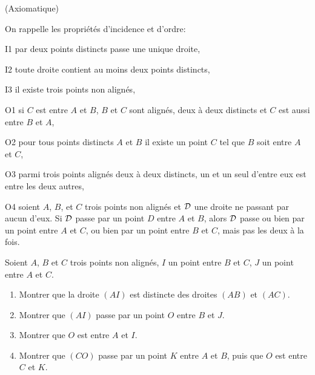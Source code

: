 \documentclass[a4paper,12pt,reqno]{amsart}
\begin{document}
\sisujet{\newpage}

\begin{exo} (Axiomatique)

  On rappelle les propriétés d'incidence et d'ordre:\\[-1.7\baselineskip]
  \begin{multicols}{2}\small
    \begin{axioms}[leftmargin=3.5em]
      \item[I1] par deux points distincts passe une unique droite,
      \item[I2] toute droite contient au moins deux points distincts,
      \item[I3] il existe trois points non alignés,
      \item[O1] si $C$ est entre $A$ et $B$, $B$ et $C$ sont alignés, deux à deux distincts et $C$ est aussi entre $B$ et $A$,
      \item[O2] pour tous points distincts $A$ et $B$ il existe un point $C$ tel que $B$ soit entre $A$ et $C$,
      \item[O3] parmi trois points alignés deux à deux distincts, un et un seul d'entre eux est entre les deux autres,
      \item[O4] soient $A$, $B$, et $C$ trois points non alignés et $\mathcal{D}$ une droite ne passant par aucun d'eux. Si $\mathcal{D}$ passe par un point $D$ entre $A$ et $B$, alors $\mathcal{D}$ passe ou bien par un point entre $A$ et $C$, ou bien par un point entre $B$ et $C$, mais pas les deux à la fois.
    \end{axioms}
  \end{multicols}\vspace{7pt}
    Soient $A$, $B$ et $C$ trois points non alignés, $I$ un point entre $B$ et $C$, $J$ un point entre $A$ et $C$.
    \begin{enumerate}
      \item Montrer que la droite $(AI)$ est distincte des droites $(AB)$ et $(AC)$.
      \item Montrer que $(AI)$ passe par un point $O$ entre $B$ et $J$.
      \item Montrer que $O$ est entre $A$ et $I$.
      \item Montrer que $(CO)$ passe par un point $K$ entre $A$ et $B$, puis que $O$ est entre $C$ et $K$.
    \end{enumerate}
\end{exo}
\end{document}
